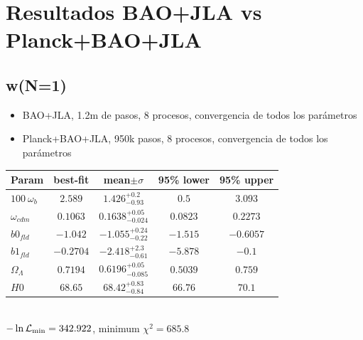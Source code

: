 \documentclass[a4paper,10pt]{article}
\begin{document}
\section{Resultados BAO+JLA vs Planck+BAO+JLA}
\subsection{w(N=1)}

\begin{itemize}
 \item BAO+JLA, 1.2m de pasos, 8 procesos, convergencia de todos los parámetros
 \item Planck+BAO+JLA, 950k pasos, 8 procesos, convergencia de todos los parámetros
\end{itemize}

\begin{tabular}{|l|c|c|c|c|} 
 \hline 
Param & best-fit & mean$\pm\sigma$ & 95\% lower & 95\% upper \\ \hline 
$100~\omega_{b }$ &$2.589$ & $1.426_{-0.93}^{+0.2}$ & $0.5$ & $3.093$ \\ 
$\omega_{cdm }$ &$0.1063$ & $0.1638_{-0.024}^{+0.05}$ & $0.0823$ & $0.2273$ \\ 
$b0_{fld }$ &$-1.042$ & $-1.055_{-0.22}^{+0.24}$ & $-1.515$ & $-0.6057$ \\ 
$b1_{fld }$ &$-0.2704$ & $-2.418_{-0.61}^{+2.3}$ & $-5.878$ & $-0.1$ \\ 
$\Omega_{\Lambda }$ &$0.7194$ & $0.6196_{-0.085}^{+0.05}$ & $0.5039$ & $0.759$ \\ 
$H0$ &$68.65$ & $68.42_{-0.84}^{+0.83}$ & $66.76$ & $70.1$ \\ 
\hline 
 \end{tabular} \\ 
$-\ln{\cal L}_\mathrm{min} =342.922$, minimum $\chi^2=685.8$ \\ 
\end{document}
